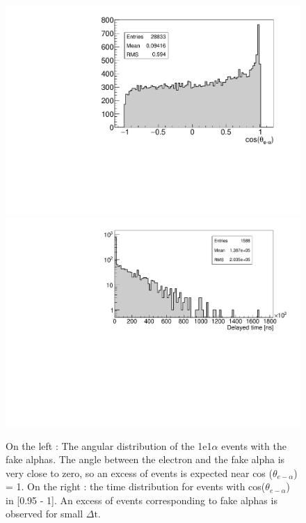 \documentclass[main.tex]{subfiles}
\begin{document}
\begin{figure}[h!]
\begin{center}
\includegraphics[scale=0.312]{pictures/Chap5/angle.pdf}
\includegraphics[scale=0.38]{pictures/Chap5/delayedTime.pdf}
\caption{On the left : The angular distribution of the 1e1$\alpha$ events with the fake alphas. The angle between the electron and the fake alpha is very close to zero, so an excess of events is expected near cos ($\theta_{e-\alpha}$) = 1. On the right : the time distribution for events with cos($\theta_{e-\alpha}$) in [0.95 - 1]. An excess of events corresponding to fake alphas is observed for small $\Delta \text{t}$.} 
\label{angularDistribution}
\end{center}
\end{figure}
\end{document}

